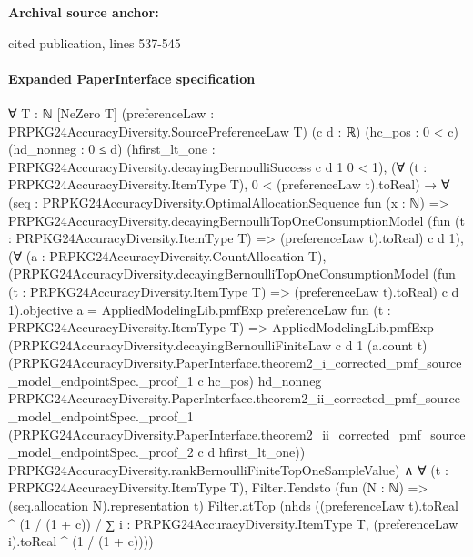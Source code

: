 \documentclass[10pt]{article}
\begin{document}
\textbf{Archival source anchor:} {\footnotesize\raggedright cited publication, lines 537-\allowbreak{}545\par}
\paragraph{Expanded PaperInterface specification}
\begin{ReviewVerbatim}
∀ {T : ℕ} [NeZero T] (preferenceLaw : PRPKG24AccuracyDiversity.SourcePreferenceLaw T) (c d : ℝ) (hc_pos : 0 < c)
  (hd_nonneg : 0 ≤ d) (hfirst_lt_one : PRPKG24AccuracyDiversity.decayingBernoulliSuccess c d 1 0 < 1),
  (∀ (t : PRPKG24AccuracyDiversity.ItemType T), 0 < (preferenceLaw t).toReal) →
    ∀
      (seq :
        PRPKG24AccuracyDiversity.OptimalAllocationSequence fun (x : ℕ) =>
          PRPKG24AccuracyDiversity.decayingBernoulliTopOneConsumptionModel
            (fun (t : PRPKG24AccuracyDiversity.ItemType T) => (preferenceLaw t).toReal) c d 1),
      (∀ (a : PRPKG24AccuracyDiversity.CountAllocation T),
          (PRPKG24AccuracyDiversity.decayingBernoulliTopOneConsumptionModel
                  (fun (t : PRPKG24AccuracyDiversity.ItemType T) => (preferenceLaw t).toReal) c d 1).objective
              a =
            AppliedModelingLib.pmfExp preferenceLaw fun (t : PRPKG24AccuracyDiversity.ItemType T) =>
              AppliedModelingLib.pmfExp
                (PRPKG24AccuracyDiversity.decayingBernoulliFiniteLaw c d 1 (a.count t)
                  (PRPKG24AccuracyDiversity.PaperInterface.theorem2_i_corrected_pmf_source_model_endpointSpec._proof_1 c
                    hc_pos)
                  hd_nonneg
                  PRPKG24AccuracyDiversity.PaperInterface.theorem2_ii_corrected_pmf_source_model_endpointSpec._proof_1
                  (PRPKG24AccuracyDiversity.PaperInterface.theorem2_ii_corrected_pmf_source_model_endpointSpec._proof_2
                    c d hfirst_lt_one))
                PRPKG24AccuracyDiversity.rankBernoulliFiniteTopOneSampleValue) ∧
        ∀ (t : PRPKG24AccuracyDiversity.ItemType T),
          Filter.Tendsto (fun (N : ℕ) => (seq.allocation N).representation t) Filter.atTop
            (nhds
              ((preferenceLaw t).toReal ^ (1 / (1 + c)) /
                ∑ i : PRPKG24AccuracyDiversity.ItemType T, (preferenceLaw i).toReal ^ (1 / (1 + c))))
\end{ReviewVerbatim}
\end{document}
